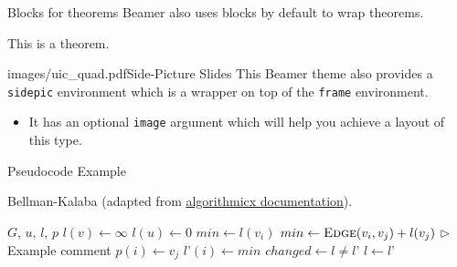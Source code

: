 \documentclass{beamer}
\newcommand{\hrefcol}[2]{\textcolor{uihteal}{\href{#1}{#2}}}
\begin{document}
\begin{frame}{Blocks for theorems}
Beamer also uses blocks by default to wrap theorems.
\begin{theorem} This is a theorem. \end{theorem}
\end{frame}


\begin{sidepic}{images/uic_quad.pdf}{Side-Picture Slides}
This Beamer theme also provides a \texttt{sidepic} environment which is a wrapper on top of the \texttt{frame} environment.
\begin{itemize}
\item It has an optional \texttt{image} argument which will help you achieve a layout of this type.
\end{itemize}
\end{sidepic}


\renewcommand{\algorithmicrequire}{\textbf{Input:}}
\renewcommand{\algorithmicensure}{\textbf{Output:}}
\newcommand*\CALL[2]{\textsc{#1}(#2)}
\newcommand*\ANNOTATE[1]{\hfill\(\triangleright\) #1}%

\footlinecolor{}

\begin{frame}{Pseudocode Example}
\begin{algorithm}[H]
\fontsize{8}{1}\selectfont
\caption{Bellman-Kalaba (adapted from \hrefcol{https://www.ctan.org/tex-archive/macros/latex/contrib/algorithmicx/algorithmicx.pdf}{algorithmicx documentation}).}
\begin{algorithmic}
\REQUIRE $G$, $u$, $l$, $p$
    \STATE $l(v) \leftarrow \infty$
\ENDFOR
\STATE $l(u) \leftarrow 0$
\REPEAT
        \STATE $min \leftarrow l(v_i)$
            \IF {$min > \CALL{Edge}{v_i, v_j} + l(v_j)$}
                \STATE $min \leftarrow \CALL{Edge}{v_i, v_j} + l(v_j)$ \ANNOTATE{Example comment}
                \STATE $p(i) \leftarrow v_j$
            \ENDIF
        \ENDFOR
        \STATE $l’(i) \leftarrow min$
    \ENDFOR
    \STATE $changed \leftarrow l \not= l’$
    \STATE $l \leftarrow l’$
\end{algorithmic}
\end{algorithm}
\end{frame}


\end{document}
